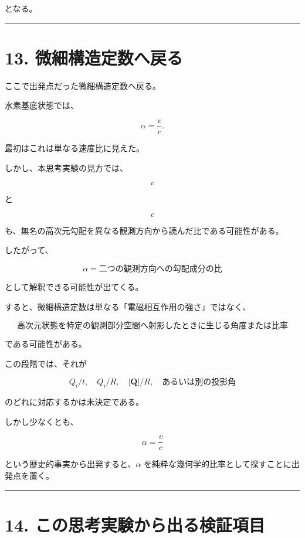 \documentclass[
  a4paper,
]{ltjsarticle}
\begin{document}
となる。

\begin{center}\rule{0.5\linewidth}{0.5pt}\end{center}

\section{13.
微細構造定数へ戻る}\label{ux5faeux7d30ux69cbux9020ux5b9aux6570ux3078ux623bux308b}

ここで出発点だった微細構造定数へ戻る。

水素基底状態では、

\[
\alpha=\frac vc.
\]

最初はこれは単なる速度比に見えた。

しかし、本思考実験の見方では、

\[
v
\]

と

\[
c
\]

も、無名の高次元勾配を異なる観測方向から読んだ比である可能性がある。

したがって、

\[
\boxed{
\alpha
=
\text{二つの観測方向への勾配成分の比}
}
\]

として解釈できる可能性が出てくる。

すると、微細構造定数は単なる「電磁相互作用の強さ」ではなく、

\[
\boxed{
\text{高次元状態を特定の観測部分空間へ射影したときに生じる角度または比率}
}
\]

である可能性がある。

この段階では、それが

\[
Q_i/t,
\quad
Q_i/R,
\quad
|\mathbf Q|/R,
\quad
\text{あるいは別の投影角}
\]

のどれに対応するかは未決定である。

しかし少なくとも、

\[
\alpha=\frac vc
\]

という歴史的事実から出発すると、\(\alpha\)
を純粋な幾何学的比率として探すことに出発点を置く。

\begin{center}\rule{0.5\linewidth}{0.5pt}\end{center}

\section{14.
この思考実験から出る検証項目}\label{ux3053ux306eux601dux8003ux5b9fux9a13ux304bux3089ux51faux308bux691cux8a3cux9805ux76ee}
\end{document}

